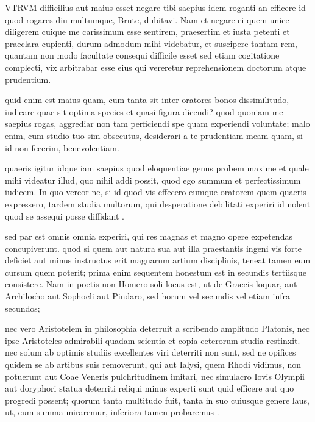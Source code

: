 
 VTRVM difficilius aut maius esset negare tibi saepius idem roganti an efficere id quod rogares diu multumque, Brute, dubitavi. Nam et negare ei quem unice diligerem cuique me carissimum esse sentirem, praesertim et iusta petenti et praeclara cupienti, durum admodum mihi videbatur, et suscipere tantam rem, quantam non modo facultate consequi difficile esset sed etiam cogitatione complecti, vix arbitrabar esse eius qui vereretur reprehensionem doctorum atque prudentium.

 quid enim est maius quam, cum tanta sit inter oratores bonos dissimilitudo, iudicare quae sit optima species et quasi figura dicendi? quod quoniam me saepius rogas, aggrediar non tam perficiendi spe quam experiendi voluntate; malo enim, cum studio tuo sim obsecutus, desiderari a te prudentiam meam quam, si id non fecerim, benevolentiam.

 quaeris igitur idque iam saepius quod eloquentiae genus probem maxime et quale mihi videatur illud, quo nihil addi possit, quod ego summum et perfectissimum iudicem. In quo vereor ne, si id quod vis effecero eumque oratorem quem quaeris expressero, tardem studia multorum, qui desperatione debilitati experiri id nolent quod se assequi posse diffidant .

 sed par est omnis omnia experiri, qui res magnas et magno opere expetendas concupiverunt. quod si quem aut natura sua aut illa praestantis ingeni vis forte deficiet aut minus instructus erit magnarum artium disciplinis, teneat tamen eum cursum quem poterit; prima enim sequentem honestum est in secundis tertiisque consistere. Nam in poetis non Homero soli locus est, ut de Graecis loquar, aut Archilocho aut Sophocli aut Pindaro, sed horum vel secundis vel etiam infra secundos;

 nec vero Aristotelem in philosophia deterruit a scribendo amplitudo Platonis, nec ipse Aristoteles admirabili quadam scientia et copia ceterorum studia restinxit. nec solum ab optimis studiis excellentes viri deterriti non sunt, sed ne opifices quidem se ab artibus suis removerunt, qui aut Ialysi, quem Rhodi vidimus, non potuerunt aut Coae Veneris pulchritudinem imitari, nec simulacro Iovis Olympii aut doryphori statua deterriti reliqui minus experti sunt quid efficere aut quo progredi possent; quorum tanta multitudo fuit, tanta in suo cuiusque genere laus, ut, cum summa miraremur, inferiora tamen probaremus .

